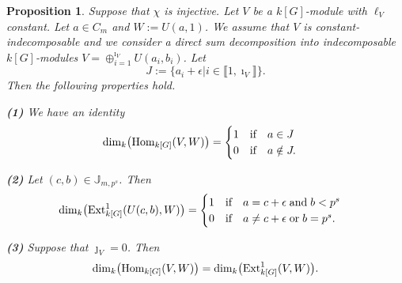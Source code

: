 \documentclass[11pt]{amsart}
\newtheorem{proposition}[theorem]{Proposition}
\def\Ext{\textup{Ext}}
\def\Hom{\textup{Hom}}
\begin{document}
\begin{proposition}\label{P2}
Suppose that $\chi$ is injective. Let $V$ be a $k[G]$-module with $\ell_V$ constant. Let $a\in C_m$ and $W:=U(a,1)$. We assume that $V$ is constant-indecomposable and we consider a direct sum decomposition into indecomposable $k[G]$-modules $V=\oplus_{i=1}^{\imath_V} U(a_i,b_i)$. Let 
$$J:=\{a_i+\epsilon|i\in\llbracket1,\imath_V\rrbracket\}.$$
Then the following properties hold.

\medskip
{\bf (1)} We have an identity
$$\dim_k\bigl(\Hom_{k[G]}(V,W)\bigr)=\begin{cases}1\quad\textup{if}\quad a\in J\\0\quad\textup{if}\quad a\notin J.\end{cases}$$

{\bf (2)} Let $(c,b)\in\mathbb J_{m,p^s}$. Then 
$$\dim_k\bigl(\Ext^1_{k[G]}(U(c,b),W)\bigr)=\begin{cases}1\quad\textup{if}\quad  a=c+\epsilon\;\textup{and}\;b<p^s\\0\quad\textup{if}\quad a\neq c+\epsilon\;\textup{or}\;b=p^s.\end{cases}$$

{\bf (3)} Suppose that $\jmath_V=0$. Then 
$$\dim_k\bigl(\Hom_{k[G]}(V,W)\bigr)=\dim_k\bigl(\Ext^1_{k[G]}(V,W)\bigr).$$
\end{proposition}
\end{document}
